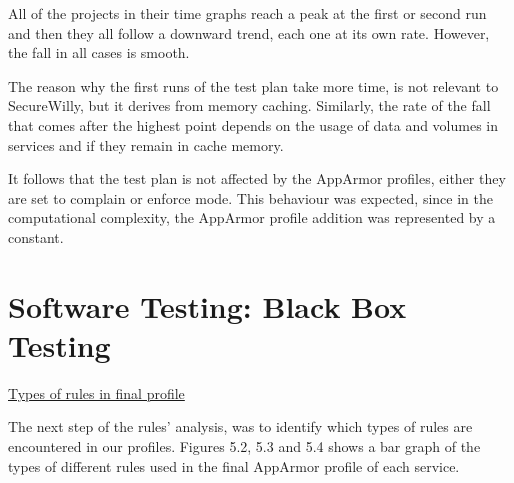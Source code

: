 All of the projects in their time graphs reach a peak at the first or second run and then they all follow a downward trend, each one at its own rate. However, the fall in all cases is smooth.

The reason why the first runs of the test plan take more time, is not relevant to SecureWilly, but it derives from memory caching. Similarly, the rate of the fall that comes after the highest point depends on the usage of data and volumes in services and if they remain in cache memory.

It follows that the test plan is not affected by the AppArmor profiles, either they are set to complain or enforce mode. This behaviour was expected, since in the computational complexity, the AppArmor profile addition was represented by a constant.

\section{Software Testing: Black Box Testing}

\hfill\break
\underline{Types of rules in final profile}
\hfill\break

The next step of the rules' analysis, was to identify which types of rules are encountered in our profiles. Figures 5.2, 5.3 and 5.4 shows a bar graph of the types of different rules used in the final AppArmor profile of each service. 


\hfill\break\hfill\break\hfill\break\hfill\break\hfill\break\hfill\break\hfill\break\hfill\break\hfill\break\hfill\break\hfill\break\hfill\break\hfill\break\hfill\break\hfill\break\hfill\break\hfill\break

